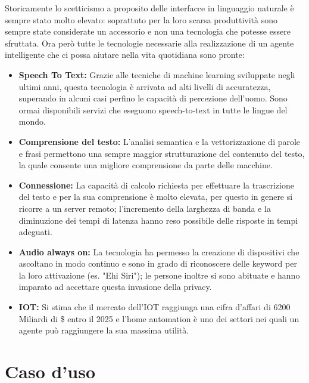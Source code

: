 \documentclass[twoside]{supsistudent}
\begin{document}
Storicamente lo scetticismo a proposito delle interfacce in linguaggio naturale è sempre stato molto elevato: soprattuto per la loro scarsa produttività sono sempre state considerate un accessorio e non una tecnologia che potesse essere sfruttata.
Ora però tutte le tecnologie necessarie alla realizzazione di un agente intelligente che ci possa aiutare nella vita quotidiana sono pronte:
\begin{itemize}
  \item \textbf{Speech To Text:} Grazie alle tecniche di machine learning sviluppate negli ultimi anni, questa tecnologia è arrivata ad alti livelli di accuratezza, superando in alcuni casi perfino le capacità di percezione dell'uomo. Sono ormai disponibili servizi che eseguono speech-to-text in tutte le lingue del mondo.\cite{sttmachinelearning}
  \item \textbf{Comprensione del testo:} L'analisi semantica e la vettorizzazione di parole e frasi permettono una sempre maggior strutturazione del contenuto del testo, la quale consente una migliore comprensione da parte delle macchine.\cite{word2vec}
  \item \textbf{Connessione:} La capacità di calcolo richiesta per effettuare la trascrizione del testo e per la sua comprensione è molto elevata, per questo in genere si ricorre a un server remoto; l'incremento della larghezza di banda e la diminuzione dei tempi di latenza hanno reso possibile delle risposte in tempi adeguati.
  \item \textbf{Audio always on:} La tecnologia ha permesso la creazione di dispositivi che ascoltano in modo continuo e sono in grado di riconoscere delle keyword per la loro attivazione (es. "Ehi Siri"); le persone inoltre si sono abituate e hanno imparato ad accettare questa invasione della privacy.
  \item \textbf{IOT:} Si stima che il mercato dell'IOT raggiunga una cifra d'affari di 6200 Miliardi di \$ entro il 2025 e l'home automation è uno dei settori nei quali un agente può raggiungere la sua massima utilità.\cite{IOTGeneral}
\end{itemize}

\chapter{Caso d'uso}
\end{document}
